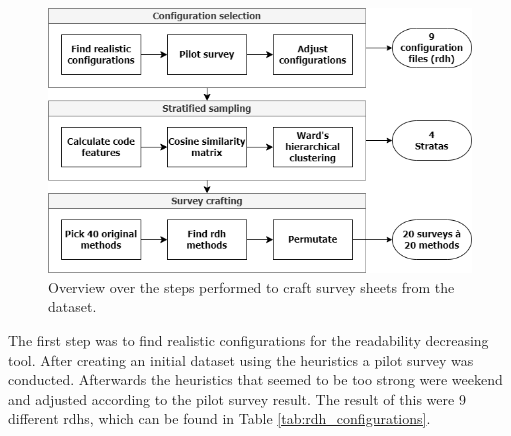 \documentclass[%
class=scrreprt,
chapterprefix=false,%
open=right,%
twoside=false,%
paper=a4,%
logofile={Logo\_zentral\_farbig\_EN.png},%
thesistype=master,%
UKenglish,%
]{se2thesis}
\begin{document}
	\begin{figure}[t]
		\centering
		\includegraphics[width=\textwidth]{img/survey_pipeline.png}
		\caption{Overview over the steps performed to craft survey sheets from the dataset.}
		\label{fig:survey_pipeline}
	\end{figure}
	
	The first step was to find realistic configurations for the readability decreasing tool. After creating an initial dataset using the heuristics a pilot survey was conducted. Afterwards the heuristics that seemed to be too strong were weekend and adjusted according to the pilot survey result. The result of this were 9 different rdhs, which can be found in Table \ref{tab:rdh_configurations}.
	
\end{document}
